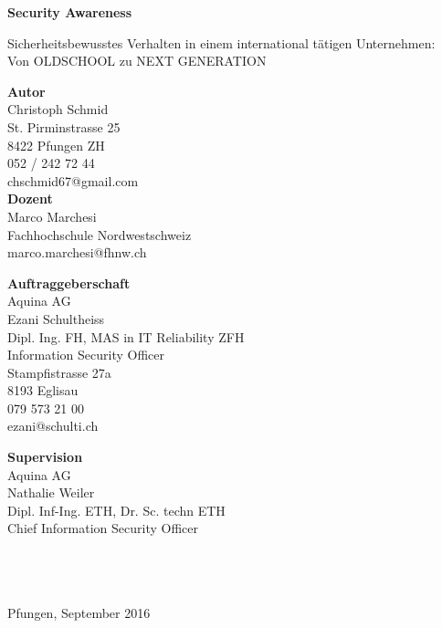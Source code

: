 \documentclass[../../main.tex]{subfiles}
\begin{document}
\vspace*{6cm}

\textbf{Security Awareness}

Sicherheitsbewusstes Verhalten in einem international tätigen Unternehmen: \\Von OLDSCHOOL zu NEXT GENERATION 
\vspace{1cm}

\textbf{Autor}\\
Christoph Schmid\\
St. Pirminstrasse 25\\
8422 Pfungen ZH\\
052 / 242 72 44\\
chschmid67@gmail.com\\


\textbf{Dozent}\\
Marco Marchesi\\
Fachhochschule Nordwestschweiz\\
marco.marchesi@fhnw.ch\\


\noindent
\begin{minipage}[H]{0.5\textwidth}
\textbf{Auftraggeberschaft}\\
Aquina AG\\
Ezani Schultheiss\\
Dipl. Ing. FH, MAS in IT Reliability ZFH\\
Information Security Officer\\
Stampfistrasse 27a\\
8193 Eglisau\\
079 573 21 00\\
ezani@schulti.ch
\end{minipage}
\hfill
\begin{minipage}[H]{0.5\textwidth}
\textbf{Supervision}\\
Aquina AG\\
Nathalie Weiler\\
Dipl. Inf-Ing. ETH, Dr. Sc. techn ETH\\
Chief Information Security Officer\\
\\
\\
\\
\end{minipage}



\vspace{1cm}

Pfungen, September 2016
\end{document}
